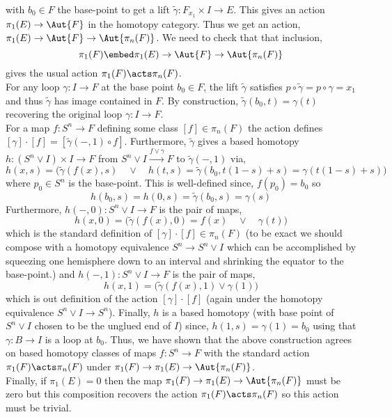 \documentclass[12pt]{extarticle}
\begin{document}
with $b_0 \in F$ the base-point to get a lift $\tilde{\gamma} : F_{x_1} \times I \to E$. This gives an action $\pi_1(E) \to \Aut{F}$ in the homotopy category. Thus we get an action, $\pi_1(E) \to \Aut{F} \to \Aut{\pi_n(F)}$. We need to check that that inclusion,
\[ \pi_1(F) \embed \pi_1(E) \to \Aut{F} \to \Aut{\pi_n(F)} \]
gives the usual action $\pi_1(F) \acts \pi_n(F)$.
\bigskip\\
For any loop $\gamma : I \to F$ at the base point $b_0 \in F$, the lift $\tilde{\gamma}$ satisfies $p \circ \tilde{\gamma} = p \circ \gamma = x_1$ and thus $\tilde{\gamma}$ has image contained in $F$. By construction, $\tilde{\gamma}(b_0, t) = \gamma(t)$ recovering the original loop $\gamma : I \to F$.
\bigskip\\
For a map $f : S^n \to F$ defining some class $[f] \in \pi_n(F)$ the action defines $[\gamma] \cdot [f] = [ \tilde{\gamma}(-,1) \circ f]$. Furthermore, $\tilde{\gamma}$ gives a based homotopy $h : (S^n \vee I) \times I \to F$ from $S^n \vee I \xrightarrow{f \vee \gamma} F$ to $\tilde{\gamma}(-,1)$ via,
\[ h(x, s) = \big( \tilde{\gamma}(f(x), s) \quad \vee \quad h(t, s) = \tilde{\gamma}(b_0, t(1 - s) + s) = \gamma(t(1-s) + s) \big) \]
where $p_0 \in S^n$ is the base-point. This is well-defined since,
 $f(p_0) = b_0$ so 
\[ h(b_0, s) = h(0, s) = \tilde{\gamma}(b_0, s) = \gamma(s) \]
Furthermore, $h(-,0) : S^n \vee I \to F$ is the pair of maps, 
\[ h(x, 0) = \big( \tilde{\gamma}(f(x), 0) = f(x) \quad \vee \quad \gamma(t) \big) \]
which is the standard definition of $[\gamma] \cdot [f] \in \pi_n(F)$ (to be exact we should compose with a homotopy equivalence $S^n \to S^n \vee I$ which can be accomplished by squeezing one hemisphere down to an interval and shrinking the equator to the base-point.)
and $h(-, 1) : S^n \vee I \to F$ is the pair of maps,
\[ h(x, 1) = \big( \tilde{\gamma}(f(x), 1) \vee \gamma(1) \big) \]
which is out definition of the action $[\gamma] \cdot [f]$ (again under the homotopy equivalence $S^n \vee I \to S^n$). Finally, $h$ is a based homotopy (with base point of $S^n \vee I$ chosen to be the unglued end of $I$) since, $h(1, s) = \gamma(1) = b_0$ using that $\gamma : B \to I$ is a loop at $b_0$. Thus, we have shown that the above construction agrees on based homotopy classes of maps $f : S^n \to F$ with the standard action $\pi_1(F) \acts \pi_n(F)$ under $\pi_1(F) \to \pi_1(E) \to \Aut{\pi_n(F)}$.
\bigskip\\
Finally, if $\pi_1(E) = 0$ then the map $\pi_1(F) \to \pi_1(E) \to \Aut{\pi_n(F)}$ must be zero  but this composition recovers the action $\pi_1(F) \acts \pi_n(F)$ so this action must be trivial.
\end{document}
